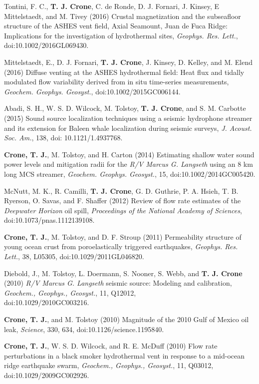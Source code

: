\documentclass[11pt]{res}
\begin{document}
\begin{resume}
Tontini, F. C., {\bf T. J. Crone}, C. de Ronde, D. J. Fornari, J. Kinsey, E Mittelstaedt,  and M. Tivey (2016) Crustal magnetization and the subseafloor structure of the ASHES vent field, Axial Seamount, Juan de Fuca Ridge: Implications for the investigation of hydrothermal sites, {\em Geophys. Res. Lett.}, doi:10.1002/2016GL069430.

Mittelstaedt, E., D. J. Fornari, {\bf T. J. Crone}, J. Kinsey, D. Kelley, and M. Elend (2016) Diffuse venting at the ASHES hydrothermal field: Heat flux and tidally modulated flow variability derived from in situ time-series measurements, {\em Geochem. Geophys. Geosyst.}, \linebreak doi:10.1002/2015GC006144.

Abadi, S. H., W. S. D. Wilcock, M. Tolstoy, {\bf T. J. Crone}, and S. M. Carbotte (2015) Sound source localization techniques using a seismic hydrophone streamer and its extension for Baleen whale localization during seismic surveys, {\em J. Acoust. Soc. Am.}, 138, doi: 10.1121/1.4937768.

{\bf Crone, T. J.}, M. Tolstoy, and H. Carton (2014) Estimating shallow water sound power levels and mitigation radii for the {\em R/V Marcus G. Langseth} using an 8 km long MCS streamer, {\em Geochem. Geophys. Geosyst.}, 15, doi:10.1002/2014GC005420.

McNutt, M. K., R. Camilli, {\bf T. J. Crone}, G. D. Guthrie, P. A. Hsieh, T. B. Ryerson, O. Savas, and F. Shaffer (2012) Review of flow rate estimates of the {\em Deepwater Horizon} oil spill, {\em Proceedings of the National Academy of Sciences}, doi:10.1073/pnas.1112139108.

{\bf Crone, T. J.}, M. Tolstoy, and D. F. Stroup (2011) Permeability structure of young ocean crust from poroelastically triggered earthquakes, {\em Geophys. Res. Lett.}, 38, L05305, doi:10.1029/2011GL046820.

Diebold, J., M. Tolstoy, L. Doermann, S. Nooner, S. Webb, and {\bf T. J. Crone} (2010) {\em R/V Marcus G. Langseth} seismic source: Modeling and calibration, {\em Geochem., Geophys., Geosyst.}, 11, Q12012,\\doi:10.1029/2010GC003216.

{\bf Crone, T. J.}, and M. Tolstoy (2010) Magnitude of the 2010 Gulf of Mexico oil leak, {\em Science}, 330, 634, doi:10.1126/science.1195840.

{\bf Crone, T. J.}, W. S. D. Wilcock, and R. E. McDuff (2010) Flow rate perturbations in a black smoker hydrothermal vent in response to a mid-ocean ridge earthquake swarm, {\em Geochem., Geophys., Geosyst.}, 11, Q03012, doi:10.1029/2009GC002926.


\end{resume}
\end{document}
